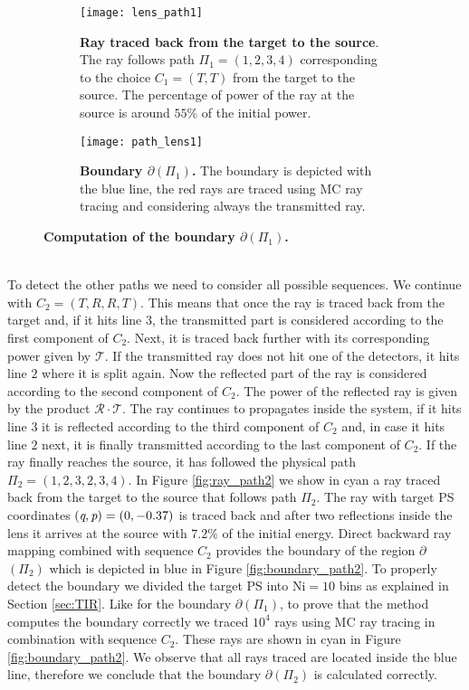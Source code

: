 \begin{figure}[t]
\centering
\begin{subfigure}[t]{.45\textwidth}
  \texttt{[image: lens\_path1]}
 \caption{\textbf{Ray traced back from the target to the source}. The ray follows path $\Pi_1 = (1,2,3,4)$ corresponding to the choice $C_1=(T,T)$ from the target to the source. The percentage of power of the ray at the source is around $55\%$ of the initial power.}
  \label{fig:ray_path1}
\end{subfigure}%
\hfill
\begin{subfigure}[t]{.45\textwidth}
  \texttt{[image: path\_lens1]}
  \caption{\textbf{Boundary $\partial$$(\Pi_1)$.} The boundary is depicted with the blue line, the red rays are traced using MC ray tracing and considering always the transmitted ray.} %
  \label{fig:boundary_path1}
\end{subfigure} %
\caption{\textbf{Computation of the boundary $\partial$$(\Pi_1)$.}}
\end{figure}
\\ \indent To detect the other paths we need to consider all possible sequences. We continue with $C_2 = (T, R, R, T)$. This means that once the ray is traced back from the target and, if it hits line $3$, the transmitted part is considered according to the first component of $C_2$. Next, it is traced back further with its corresponding power given by $\mathcal{T}$. If the transmitted ray does not hit one of the detectors, it hits line $2$ where it is split again. Now the reflected part of the ray is considered according to the second component of $C_2$. The power of the reflected ray is given by the product $\mathcal{R}\cdot \mathcal{T}$. The ray continues to propagates inside the system, if it hits line $3$ it is reflected according to the third component of $C_2$ and, in case it hits line $2$ next, it is finally transmitted according to the last component of $C_2$. If the ray finally reaches the source, it has followed the physical path $\Pi_2 = (1,2,3,2,3,4)$. 
In Figure \ref{fig:ray_path2} we show in cyan a ray traced back from the target to the source that follows path $\Pi_2$. The ray with target PS coordinates $(\textit{q}, \textit{p})=(0,-0.37)$ is traced back and after two reflections inside the lens it arrives at the source with $7.2\%$ of the initial energy. Direct backward ray mapping combined with sequence $C_2$ provides the boundary of the region $\partial$$(\Pi_2)$ which is depicted in blue in Figure \ref{fig:boundary_path2}. To properly detect the boundary we divided the target PS into $\textrm{Ni}=10$ bins as explained in Section \ref{sec:TIR}. Like for the boundary $\partial$$(\Pi_1)$, to prove that the method computes the boundary correctly we traced $10^4$ rays using MC ray tracing in combination with sequence $C_2$. These rays are shown in cyan in Figure \ref{fig:boundary_path2}. We observe that all rays traced are located inside the blue line, therefore we conclude that the boundary $\partial$$(\Pi_2)$ is calculated correctly.
